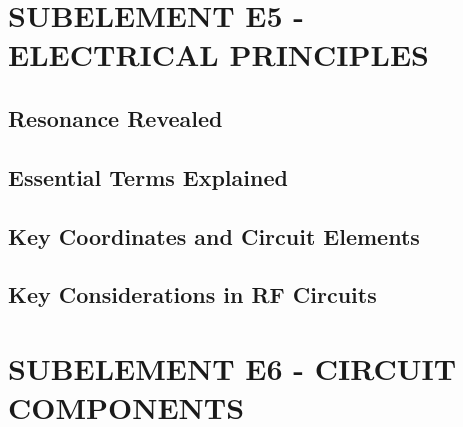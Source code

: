 \documentclass[12pt]{book}
\begin{document}
\chapter{SUBELEMENT E5 - ELECTRICAL PRINCIPLES}
\section{Resonance Revealed}













\section{Essential Terms Explained}












\section{Key Coordinates and Circuit Elements}












\section{Key Considerations in RF Circuits}












\chapter{SUBELEMENT E6 - CIRCUIT COMPONENTS}
\end{document}
